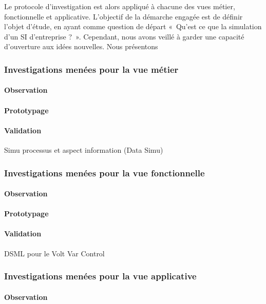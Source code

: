 	Le protocole d'investigation est alors appliqué à chacune des vues métier, 
fonctionnelle et applicative. L'objectif de la démarche engagée est de définir 
l'objet d'étude, en ayant comme question de départ «~Qu'est ce que la simulation 
d'un SI d'entreprise ?~». Cependant, nous avons veillé à garder une capacité 
d'ouverture aux idées nouvelles. Nous présentons
	
		\subsubsection{Investigations menées pour la vue métier}
	
			\paragraph{Observation}
		
			\paragraph{Prototypage}
		
			\paragraph{Validation}
	Simu processus et aspect information (Data Simu)
	
		\subsubsection{Investigations menées pour la vue fonctionnelle} 
			\paragraph{Observation}
		
			\paragraph{Prototypage}
		
			\paragraph{Validation}
	DSML pour le Volt Var Control
		\subsubsection{Investigations menées pour la vue applicative} 
			\paragraph{Observation}
		
